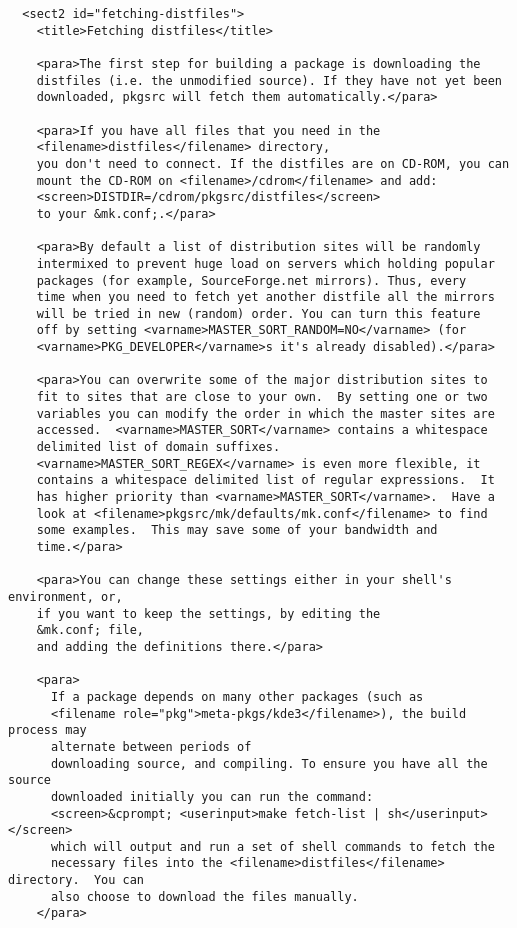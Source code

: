 \begin{verbatim}
  <sect2 id="fetching-distfiles">
    <title>Fetching distfiles</title>

    <para>The first step for building a package is downloading the
    distfiles (i.e. the unmodified source). If they have not yet been
    downloaded, pkgsrc will fetch them automatically.</para>

    <para>If you have all files that you need in the
    <filename>distfiles</filename> directory,
    you don't need to connect. If the distfiles are on CD-ROM, you can
    mount the CD-ROM on <filename>/cdrom</filename> and add:
    <screen>DISTDIR=/cdrom/pkgsrc/distfiles</screen>
    to your &mk.conf;.</para>

    <para>By default a list of distribution sites will be randomly
    intermixed to prevent huge load on servers which holding popular
    packages (for example, SourceForge.net mirrors). Thus, every
    time when you need to fetch yet another distfile all the mirrors
    will be tried in new (random) order. You can turn this feature
    off by setting <varname>MASTER_SORT_RANDOM=NO</varname> (for
    <varname>PKG_DEVELOPER</varname>s it's already disabled).</para>

    <para>You can overwrite some of the major distribution sites to
    fit to sites that are close to your own.  By setting one or two
    variables you can modify the order in which the master sites are
    accessed.  <varname>MASTER_SORT</varname> contains a whitespace
    delimited list of domain suffixes.
    <varname>MASTER_SORT_REGEX</varname> is even more flexible, it
    contains a whitespace delimited list of regular expressions.  It
    has higher priority than <varname>MASTER_SORT</varname>.  Have a
    look at <filename>pkgsrc/mk/defaults/mk.conf</filename> to find
    some examples.  This may save some of your bandwidth and
    time.</para>

    <para>You can change these settings either in your shell's environment, or,
    if you want to keep the settings, by editing the
    &mk.conf; file,
    and adding the definitions there.</para>

    <para>
      If a package depends on many other packages (such as
      <filename role="pkg">meta-pkgs/kde3</filename>), the build process may
      alternate between periods of
      downloading source, and compiling. To ensure you have all the source
      downloaded initially you can run the command:
      <screen>&cprompt; <userinput>make fetch-list | sh</userinput></screen>
      which will output and run a set of shell commands to fetch the
      necessary files into the <filename>distfiles</filename> directory.  You can
      also choose to download the files manually.
    </para>


\end{verbatim}
